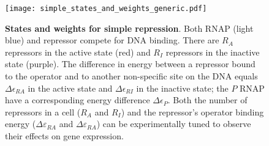 \begin{figure}[h]
	\centering
	\texttt{[image: simple\_states\_and\_weights\_generic.pdf]}
	\caption{{\bf States and weights for simple repression}. 
		 Both RNAP
		(light blue) and repressor compete for DNA binding. There are $R_A$ repressors
		in the active state (red) and $R_I$ repressors in the inactive state (purple).
		The difference in energy between a repressor bound to the operator and to
		another non-specific site on the DNA equals $\Delta\epsilon_{RA}$ in the active
		state and $\Delta\epsilon_{RI}$ in the inactive state; the $P$ RNAP have a
		corresponding energy difference $\Delta\epsilon_{P}$. 
		 Both the number of
		repressors in a cell ($R_A$ and $R_I$) and the repressor's operator binding
		energy ($\Delta \varepsilon_{RA}$ and $\Delta \varepsilon_{RA}$) can be
		experimentally tuned to observe their effects on gene expression.
	} \label{figpolymeraseRepressorStates}
\end{figure}


